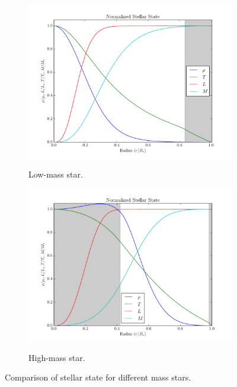 \documentclass[11pt]{article}
\begin{document}
    \begin{center}
        \begin{figure}[H]
            \begin{subfigure}{.5\textwidth}
                \centering
                \caption{Low-mass star.}
                \includegraphics[width=1.1\textwidth]{figures/lowmass/stellar_state.pdf}
                \label{fig:massstarslow}
            \end{subfigure}
            \begin{subfigure}{.5\textwidth}
                \centering
                \caption{High-mass star.}
                \includegraphics[width=1.1\textwidth]{figures/highmass/stellar_state.pdf}
                \label{fig:massstarshigh}
            \end{subfigure}
            \caption{Comparison of stellar state for different mass stars.}
            \label{fig:stellarstatecomparisonmass}
        \end{figure}
    \end{center}
\end{document}

